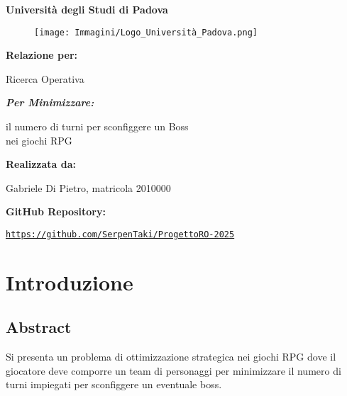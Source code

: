 \documentclass[12pt]{article}
\renewcommand{\familydefault}{\rmdefault} %
\begin{document}
\begin{titlepage}
    \centering
    {\Huge \textbf{Università degli Studi di Padova} \par}
    \vspace{1cm}
    \begin{figure}[h!]
        \centering
        \texttt{[image: Immagini/Logo\_Università\_Padova.png]}
    \end{figure}
    \vspace{0.5cm}
    {\LARGE \textbf{Relazione per:} \par}
    {\Huge Ricerca Operativa \par}
    \vspace{0.5cm}
    {\Large \textit{\textbf{Per Minimizzare:}} \par}
    {\Large il numero di turni per sconfiggere un Boss\\ nei giochi RPG \par}
    \vfill
    \textbf{Realizzata da:} \par
    Gabriele Di Pietro, matricola 2010000 \par
    \vspace{0.5cm}
    \textbf{GitHub Repository:} \par
    \texttt{\url{https://github.com/SerpenTaki/ProgettoRO-2025}}
\end{titlepage}
    \renewcommand{\familydefault}{\sfdefault} %
    \fontsize{10}{12}\selectfont
    \newpage
    \tableofcontents
    \newpage
    \section{Introduzione}
    \subsection{Abstract}
    Si presenta un problema di ottimizzazione strategica nei giochi RPG dove il giocatore deve comporre un team di personaggi per minimizzare il numero di turni impiegati per sconfiggere un eventuale boss.
\end{document}
